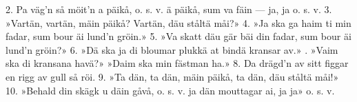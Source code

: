\setlength{\columnsep}{0.5cm}
\begin{multicols*}{2}
2.  Pa väg’n så möit’n a päikå, o. s. v.
    ä päikå, sum va fäin — ja, ja o. s. v.
3.  »Vartän, vartän, mäin päikå?
    Vartän, däu ståltä måi?»
4.  »Ja ska ga haim ti min fadar,
    sum bour äi lund’n gröin.»
5.  »Va skatt däu gär bäi din fadar,
    sum bour äi lund’n gröin?»
6.  »Dä ska ja di bloumar plukkä
    at bindä kransar av.»
\vfill{}.  »Vaim ska di kransana havä?»
    »Daim ska min fästman ha.»
8.  Da drägd’n av sitt figgar
    en rigg av gull så röi.
9.  »Ta dän, ta dän, mäin päikå,
    ta dän, däu ståltä måi!»
10. »Behald din skägk u däin gåvå, o. s. v.
    ja dän mouttagar ai, ja ja» o. s. v.
\end{multicols*}